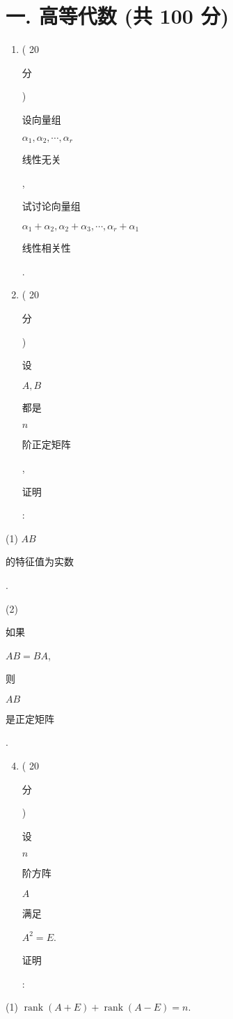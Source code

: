 \documentclass[10pt]{article}
\begin{document}
\section{一. 高等代数 (共 100 分)}
\begin{enumerate}
  \item ( 20 \begin{CJK}{UTF8}{mj}分\end{CJK}) \begin{CJK}{UTF8}{mj}设向量组\end{CJK} $\alpha_{1}, \alpha_{2}, \cdots, \alpha_{r}$ \begin{CJK}{UTF8}{mj}线性无关\end{CJK}, \begin{CJK}{UTF8}{mj}试讨论向量组\end{CJK} $\alpha_{1}+\alpha_{2}, \alpha_{2}+\alpha_{3}, \cdots, \alpha_{r}+\alpha_{1}$ \begin{CJK}{UTF8}{mj}线性相关性\end{CJK}.

  \item ( 20 \begin{CJK}{UTF8}{mj}分\end{CJK}) \begin{CJK}{UTF8}{mj}设\end{CJK} $A, B$ \begin{CJK}{UTF8}{mj}都是\end{CJK} $n$ \begin{CJK}{UTF8}{mj}阶正定矩阵\end{CJK}, \begin{CJK}{UTF8}{mj}证明\end{CJK}:

\end{enumerate}
(1) $A B$ \begin{CJK}{UTF8}{mj}的特征值为实数\end{CJK}.

(2) \begin{CJK}{UTF8}{mj}如果\end{CJK} $A B=B A$, \begin{CJK}{UTF8}{mj}则\end{CJK} $A B$ \begin{CJK}{UTF8}{mj}是正定矩阵\end{CJK}.

\begin{enumerate}
  \setcounter{enumi}{3}
  \item ( 20 \begin{CJK}{UTF8}{mj}分\end{CJK}) \begin{CJK}{UTF8}{mj}设\end{CJK} $n$ \begin{CJK}{UTF8}{mj}阶方阵\end{CJK} $A$ \begin{CJK}{UTF8}{mj}满足\end{CJK} $A^{2}=E$. \begin{CJK}{UTF8}{mj}证明\end{CJK}:
\end{enumerate}
(1) $\operatorname{rank}(A+E)+\operatorname{rank}(A-E)=n$.
\end{document}
